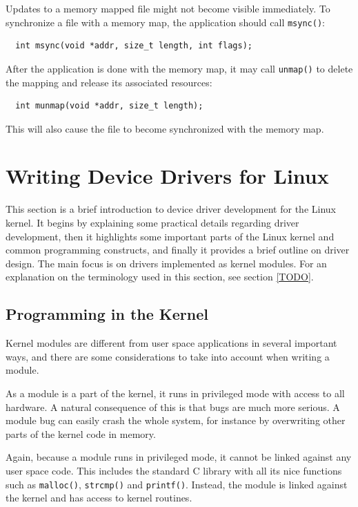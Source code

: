 Updates to a memory mapped file might not become visible immediately. To synchronize a file with a memory map, the application should call \texttt{msync()}:
\begin{verbatim}
  int msync(void *addr, size_t length, int flags);
\end{verbatim}

After the application is done with the memory map, it may call \texttt{unmap()} to delete the mapping and release its associated resources: 
\begin{verbatim}
  int munmap(void *addr, size_t length);
\end{verbatim}
This will also cause the file to become synchronized with the memory map.



\section{Writing Device Drivers for Linux}\label{writing-device-drivers-for-linux}
This section is a brief introduction to device driver development for the Linux kernel. It begins by explaining some practical details regarding driver development, then it highlights some important parts of the Linux kernel and common programming constructs, and finally it provides a brief outline on driver design. The main focus is on drivers implemented as kernel modules. For an explanation on the terminology used in this section, see section \ref{TODO}.



\subsection{Programming in the Kernel}
Kernel modules are different from user space applications in several important ways, and there are some considerations to take into account when writing a module.

As a module is a part of the kernel, it runs in privileged mode with access to all hardware. A natural consequence of this is that bugs are much more serious. A module bug can easily crash the whole system, for instance by overwriting other parts of the kernel code in memory.

Again, because a module runs in privileged mode, it cannot be linked against any user space code. This includes the standard C library with all its nice functions such as \texttt{malloc()}, \texttt{strcmp()} and \texttt{printf()}. Instead, the module is linked against the kernel and has access to kernel routines.

